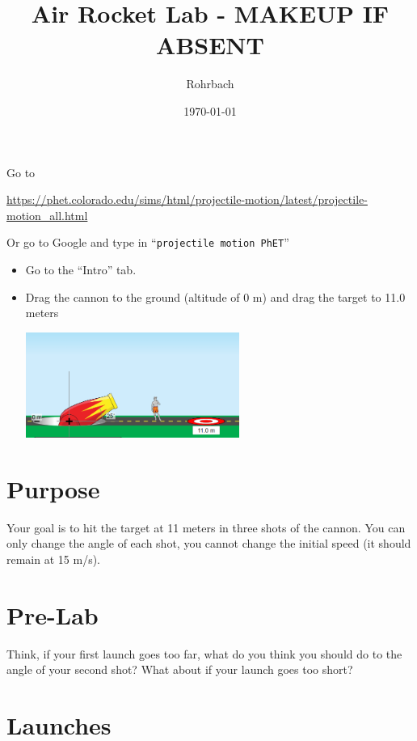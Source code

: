 \documentclass[10pt]{exam}
\title{Air Rocket Lab - MAKEUP IF ABSENT}
\author{Rohrbach}
\date{\today}
\begin{document}
\maketitle


\noindent
Go to 

{\small \url{https://phet.colorado.edu/sims/html/projectile-motion/latest/projectile-motion_all.html}}

\noindent
Or go to Google and type in ``\texttt{projectile motion PhET}''

\begin{itemize}
  \item Go to the ``Intro'' tab.
  \item Drag the cannon to the ground (altitude of 0 m)	and drag the target to 11.0 meters
  
  \includegraphics[width=7cm]{cannon.png} 
\end{itemize}


\section*{Purpose}
 Your goal is to hit the target at 11 meters in three shots of the cannon.  You can only change the angle of each shot, you cannot change the initial speed (it should remain at 15 m/s).

\section*{Pre-Lab}

\begin{questions}


  \question
    Think, if your first launch goes too far, what do you think you should do to the angle of your second shot?  What about if your launch goes too short?
    \vspace{5em}

  
\end{questions}

\section*{Launches}
\end{document}

